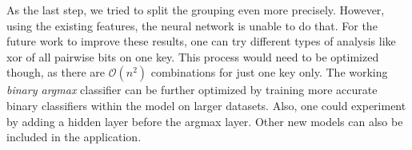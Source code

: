 As the last step, we tried to split the grouping even more precisely. However, using the existing features, the neural network is unable to do that. For the future work to improve these results, one can try different types of analysis like xor of all pairwise bits on one key. This process would need to be optimized though, as there are $\mathcal{O}(n^2)$ combinations for just one key only. The working \textit{binary argmax} classifier can be further optimized by training more accurate binary classifiers within the model on larger datasets. Also, one could experiment by adding a hidden layer before the argmax layer. Other new models can also be included in the application.

